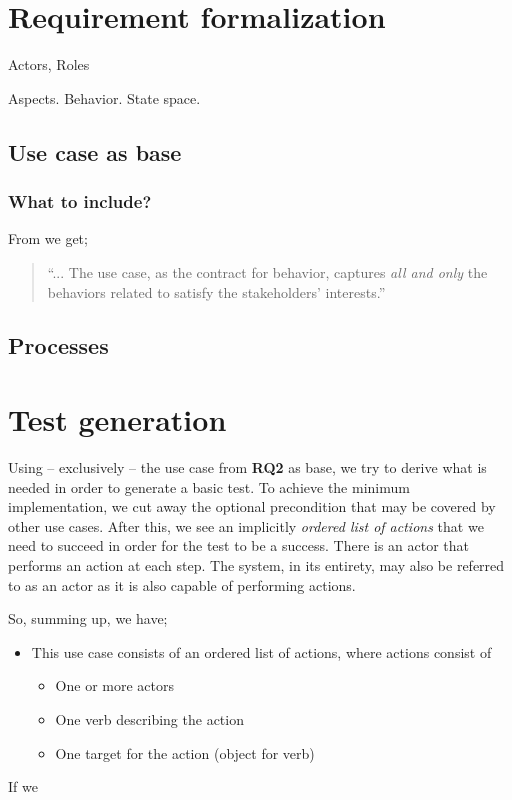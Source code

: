 \chapter{Requirement formalization}
Actors, Roles

Aspects. Behavior. State space.

\section{Use case as base}

\subsection{What to include?}
From \cite{Cockburn:2000:WEU:517669} we get;
\begin{quote}
``... The use case, as the contract for behavior, captures \emph{all and only} the behaviors related to satisfy the stakeholders’ interests.''
\end{quote}

\section{Processes}

\chapter{Test generation}
Using -- exclusively -- the use case from \textbf{RQ2} as base, we try to derive what is needed in order to generate a basic test.
To achieve the minimum implementation, we cut away the optional precondition that may be covered by other use cases. After this, we see an implicitly \emph{ordered list of actions} that we need to succeed in order for the test to be a success. There is an actor that performs an action at each step. The system, in its entirety, may also be referred to as an actor as it is also capable of performing actions.

So, summing up, we have;
\begin{itemize}
  \item This use case consists of an ordered list of actions, where actions consist of
  \begin{itemize}
	\item One or more actors
	\item One verb describing the action
	\item One target for the action (object for verb)
  \end{itemize}
\end{itemize}
If we 

